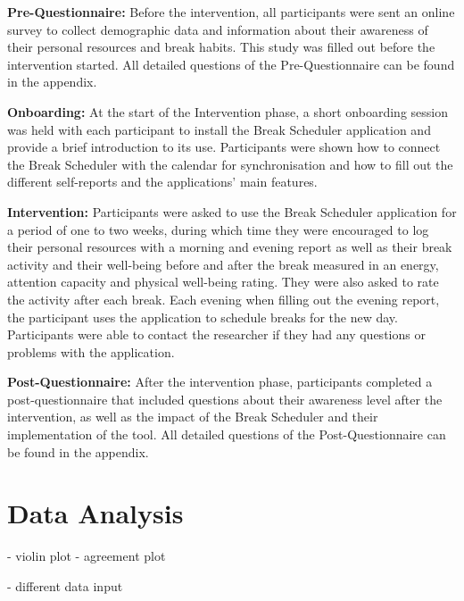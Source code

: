 \documentclass{hasel_thesis}
\begin{document}
\textbf{Pre-Questionnaire:} Before the intervention, all participants were sent an online survey to collect demographic data and information about their awareness of their personal resources and break habits. This study was filled out before the intervention started. All detailed questions of the Pre-Questionnaire can be found in the appendix.

\textbf{Onboarding:} At the start of the Intervention phase, a short onboarding session was held with each participant to install the Break Scheduler application and provide a brief introduction to its use. Participants were shown how to connect the Break Scheduler with the calendar for synchronisation and how to fill out the different self-reports and the applications' main features.

\textbf{Intervention:} Participants were asked to use the Break Scheduler application for a period of one to two weeks, during which time they were encouraged to log their personal resources with a morning and evening report as well as their break activity and their well-being before and after the break measured in an energy, attention capacity and physical well-being rating. They were also asked to rate the activity after each break. Each evening when filling out the evening report, the participant uses the application to schedule breaks for the new day. Participants were able to contact the researcher if they had any questions or problems with the application.

\textbf{Post-Questionnaire:} After the intervention phase, participants completed a post-questionnaire that included questions about their awareness level after the intervention, as well as the impact of the Break Scheduler and their implementation of the tool. All detailed questions of the Post-Questionnaire can be found in the appendix.

\section{Data Analysis}
- violin plot
- agreement plot

- different data input
\end{document}
